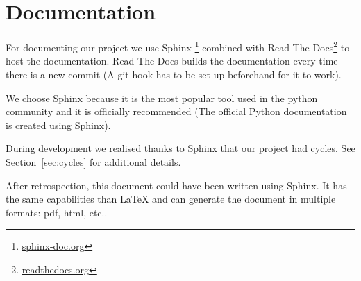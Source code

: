 \section{Documentation}
\label{sec:documentation}

For documenting our project we use Sphinx
\footnote{\href{http://www.sphinx-doc.org}{sphinx-doc.org}} combined with Read
The Docs\footnote{\href{https://readthedocs.org}{readthedocs.org}} to host the
documentation. Read The Docs builds the documentation every time there is a new
commit (A git hook has to be set up beforehand for it to work).

We choose Sphinx because it is the most popular tool used in the python
community and it is officially recommended (The official Python documentation is
created using Sphinx).

During development we realised thanks to Sphinx that our project had cycles. See
Section~\ref{sec:cycles} for additional details.

After retrospection, this document could have been written using Sphinx. It has
the same capabilities than \LaTeX{} and can generate the document in multiple
formats: pdf, html, etc..
